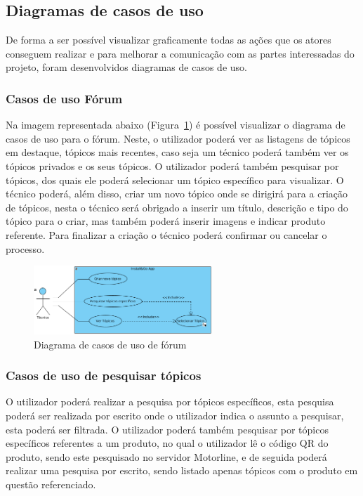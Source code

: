 
\subsection{Diagramas de casos de uso}
De forma a ser possível visualizar graficamente todas as ações que os 
atores conseguem realizar e para melhorar a comunicação com as 
partes interessadas do projeto, foram desenvolvidos diagramas de 
casos de uso.

\subsubsection{Casos de uso Fórum}
Na imagem representada abaixo (Figura~\ref{fig:12}) é possível 
visualizar o diagrama de casos de uso para o fórum.
Neste, o utilizador poderá ver as listagens de tópicos em destaque, tópicos mais recentes, caso seja um 
técnico poderá também ver os tópicos privados e os seus tópicos. 
O utilizador poderá também pesquisar por tópicos,  dos quais ele poderá selecionar um tópico 
específico para visualizar. 
O técnico poderá, além disso, criar um novo tópico onde se dirigirá para a criação de tópicos,
nesta o técnico será obrigado a inserir um título, descrição e tipo do tópico para o criar, 
mas também poderá inserir imagens e indicar produto referente.
Para finalizar a criação o técnico poderá confirmar ou cancelar o processo. 

\begin{figure}[htb]
    \centering
    \includegraphics[width=0.6\textwidth]{images/diagramas/casos_de_uso/use_case_forum.png}
    \caption{Diagrama de casos de uso de fórum}
    \label{fig:12}
\end{figure}

\subsubsection{Casos de uso de pesquisar tópicos}

O utilizador poderá realizar a pesquisa por tópicos específicos, 
esta pesquisa poderá ser realizada por escrito onde o utilizador indica o assunto a pesquisar, esta poderá ser filtrada.
O utilizador poderá também pesquisar por tópicos específicos referentes a um produto, no qual o utilizador 
lê o código QR do produto, sendo este pesquisado no servidor Motorline, e de seguida poderá realizar 
uma pesquisa por escrito, sendo listado apenas tópicos com o produto em questão referenciado.

